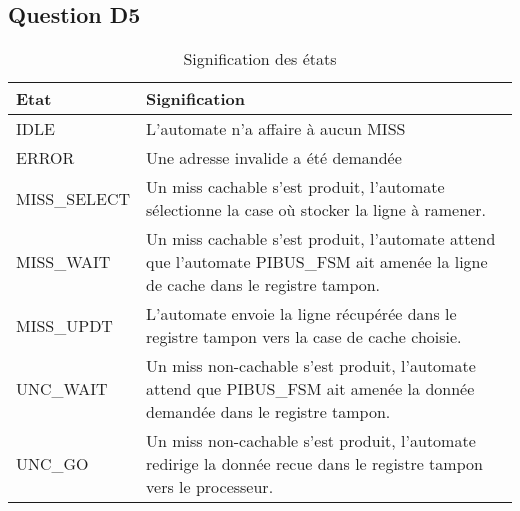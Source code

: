 \documentclass{article}
\begin{document}
\subsection{Question D5}


\begin{table}[H]
\centering
\begingroup
\setlength{\tabcolsep}{5pt}
\renewcommand{\arraystretch}{1.1}
\begin{tabular}{| l | p{14cm} |}

\hline
\textbf{Etat} & \textbf{Signification} \\
\hline
\hline
IDLE
&
L'automate n'a affaire à aucun MISS
\\
\hline

ERROR
&
Une adresse invalide a été demandée
\\
\hline

MISS\_SELECT
&
Un miss cachable s'est produit, l'automate sélectionne la case où
stocker la ligne à ramener.
\\
\hline

MISS\_WAIT
&
Un miss cachable s'est produit, l'automate attend que l'automate PIBUS\_FSM
ait amenée la ligne de cache dans le registre tampon.
\\
\hline

MISS\_UPDT
&
L'automate envoie la ligne récupérée dans le registre tampon vers la case
de cache choisie.
\\
\hline

UNC\_WAIT
&
Un miss non-cachable s'est produit, l'automate attend que PIBUS\_FSM ait
amenée la donnée demandée dans le registre tampon.
\\
\hline

UNC\_GO
&
Un miss non-cachable s'est produit, l'automate redirige la donnée recue
dans le registre tampon vers le processeur.
\\
\hline

\end{tabular}
\caption{Signification des états}
\endgroup
\end{table}
\end{document}
